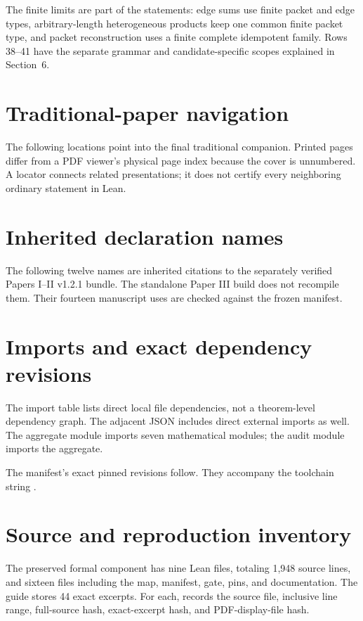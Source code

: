 The finite limits are part of the statements: edge sums use finite packet and edge types, arbitrary-length heterogeneous products keep one common finite packet type, and packet reconstruction uses a finite complete idempotent family. Rows 38--41 have the separate grammar and candidate-specific scopes explained in Section~6.

\clearpage
\appendix
\section{Traditional-paper navigation}\label{app:crosswalk}
The following locations point into the final traditional companion. Printed pages differ from a PDF viewer's physical page index because the cover is unnumbered. A locator connects related presentations; it does not certify every neighboring ordinary statement in Lean.

\section{Inherited declaration names}\label{app:inherited}
The following twelve names are inherited citations to the separately verified Papers I--II v1.2.1 bundle. The standalone Paper III build does not recompile them. Their fourteen manuscript uses are checked against the frozen manifest.

\clearpage
\section{Imports and exact dependency revisions}
The import table lists direct local file dependencies, not a theorem-level dependency graph. The adjacent JSON includes direct external imports as well. The aggregate module imports seven mathematical modules; the audit module imports the aggregate.

The manifest's exact pinned revisions follow. They accompany the toolchain string .

\clearpage
\section{Source and reproduction inventory}
The preserved formal component has nine Lean files, totaling 1,948 source lines, and sixteen files including the map, manifest, gate, pins, and documentation. The guide stores 44 exact excerpts. For each,  records the source file, inclusive line range, full-source hash, exact-excerpt hash, and PDF-display-file hash.

